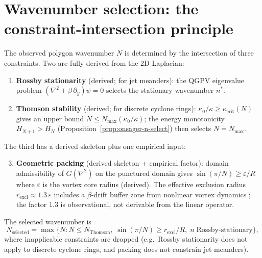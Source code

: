 \section{Wavenumber selection: the constraint-intersection principle}
\label{sec:constraint-intersection}

\begin{proposition}\label{prop:complementary}
The observed polygon wavenumber $N$ is determined by the intersection of
three constraints.  Two are fully derived from the 2D Laplacian:
\begin{enumerate}
  \item \textbf{Rossby stationarity} (derived; for jet meanders):
    the QGPV eigenvalue problem
    $(\nabla^2 + \beta\,\partial_y)\psi = 0$ selects the stationary
    wavenumber $n^*$.
  \item \textbf{Thomson stability} (derived; for discrete cyclone rings):
    $\kappa_0/\kappa \ge \kappa_{\mathrm{crit}}(N)$ gives an upper
    bound $N \le N_{\max}(\kappa_0/\kappa)$; the energy monotonicity
    $H_{N+1} > H_N$ (Proposition~\ref{prop:onsager-n-select}) then
    selects $N = N_{\max}$.
\end{enumerate}
The third has a derived skeleton plus one empirical input:
\begin{enumerate}\setcounter{enumi}{2}
  \item \textbf{Geometric packing} (derived skeleton + empirical factor):
    domain admissibility of $G(\nabla^2)$ on the punctured domain
    gives $\sin(\pi/N) \ge \varepsilon/R$ where $\varepsilon$ is
    the vortex core radius (derived).  The effective exclusion radius
    $r_{\mathrm{excl}} \approx 1.3\,\varepsilon$ includes a
    $\beta$-drift buffer zone from nonlinear vortex dynamics
    \citep{Gavriel2021}; the factor $1.3$ is observational, not
    derivable from the linear operator.
\end{enumerate}
The selected wavenumber is
\begin{equation}\label{eq:constraint-intersection}
  N_{\mathrm{selected}} = \max\bigl\{N :
    N \le N_{\mathrm{Thomson}},\;
    \sin(\pi/N) \ge r_{\mathrm{excl}}/R,\;
    n\;\text{Rossby-stationary}\bigr\},
\end{equation}
where inapplicable constraints are dropped (e.g.\ Rossby stationarity
does not apply to discrete cyclone rings, and packing does not constrain
jet meanders).
\end{proposition}

